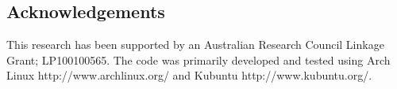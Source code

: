 \documentclass[article]{jss}
\begin{document}
\subsection*{Acknowledgements}

This research has been supported by an Australian Research Council
Linkage Grant; LP100100565. The code was primarily developed and
tested using Arch Linux http://www.archlinux.org/ and Kubuntu
http://www.kubuntu.org/.


\end{document}
